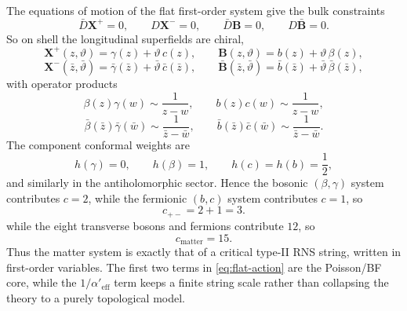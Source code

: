 \documentclass[11pt]{article}
\newcommand{\Aeff}{\alpha'_{\mathrm{eff}}}
\begin{document}
The equations of motion of the flat first-order system give the bulk constraints
\begin{equation}\label{eq:bulk-chiral-constraints}
\bar D\mathbf X^+=0,
\qquad
D\mathbf X^-=0,
\qquad
\bar D\mathbf B=0,
\qquad
D\bar{\mathbf B}=0.
\end{equation}
So on shell the longitudinal superfields are chiral,
\begin{equation}\label{eq:onshell-plus}
\mathbf X^+(z,\vartheta)=\gamma(z)+\vartheta\,c(z),
\qquad
\mathbf B(z,\vartheta)=b(z)+\vartheta\,\beta(z),
\end{equation}
\begin{equation}\label{eq:onshell-minus}
\mathbf X^-(\bar z,\bar\vartheta)=\bar\gamma(\bar z)+\bar\vartheta\,\bar c(\bar z),
\qquad
\bar{\mathbf B}(\bar z,\bar\vartheta)=\bar b(\bar z)+\bar\vartheta\,\bar\beta(\bar z),
\end{equation}
with operator products
\begin{equation}\label{eq:ope-holomorphic}
\beta(z)\gamma(w)\sim \frac{1}{z-w},
\qquad
b(z)c(w)\sim \frac{1}{z-w},
\end{equation}
\begin{equation}\label{eq:ope-antiholomorphic}
\bar\beta(\bar z)\bar\gamma(\bar w)\sim \frac{1}{\bar z-\bar w},
\qquad
\bar b(\bar z)\bar c(\bar w)\sim \frac{1}{\bar z-\bar w}.
\end{equation}
The component conformal weights are
\begin{equation}\label{eq:component-weights}
h(\gamma)=0,
\qquad
h(\beta)=1,
\qquad
h(c)=h(b)=\frac{1}{2},
\end{equation}
and similarly in the antiholomorphic sector. Hence the bosonic $(\beta,\gamma)$ system contributes $c=2$, while the fermionic $(b,c)$ system contributes $c=1$, so
\begin{equation}\label{eq:longitudinal-central-charge}
c_{+-}=2+1=3.
\end{equation}
while the eight transverse bosons and fermions contribute $12$, so
\begin{equation}\label{eq:total-central-charge}
c_{\mathrm{matter}}=15.
\end{equation}
Thus the matter system is exactly that of a critical type-II RNS string, written in first-order variables. The first two terms in \eqref{eq:flat-action} are the Poisson/BF core, while the $1/\Aeff$ term keeps a finite string scale rather than collapsing the theory to a purely topological model.
\end{document}
